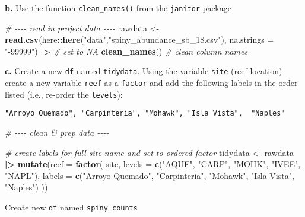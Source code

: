 \documentclass[
]{article}
\newenvironment{Shaded}{\begin{snugshade}}{\end{snugshade}}
\newcommand{\AttributeTok}[1]{\textcolor[rgb]{0.13,0.29,0.53}{#1}}
\newcommand{\CommentTok}[1]{\textcolor[rgb]{0.56,0.35,0.01}{\textit{#1}}}
\newcommand{\FunctionTok}[1]{\textcolor[rgb]{0.13,0.29,0.53}{\textbf{#1}}}
\newcommand{\NormalTok}[1]{#1}
\newcommand{\OtherTok}[1]{\textcolor[rgb]{0.56,0.35,0.01}{#1}}
\newcommand{\SpecialCharTok}[1]{\textcolor[rgb]{0.81,0.36,0.00}{\textbf{#1}}}
\newcommand{\StringTok}[1]{\textcolor[rgb]{0.31,0.60,0.02}{#1}}
\begin{document}
\textbf{b.} Use the function \texttt{clean\_names()} from the
\texttt{janitor} package

\begin{Shaded}
\begin{Highlighting}[]
\CommentTok{\# {-}{-}{-}{-} read in project data {-}{-}{-}{-}}
\NormalTok{rawdata }\OtherTok{\textless{}{-}} \FunctionTok{read.csv}\NormalTok{(here}\SpecialCharTok{::}\FunctionTok{here}\NormalTok{(}\StringTok{"data"}\NormalTok{,}\StringTok{"spiny\_abundance\_sb\_18.csv"}\NormalTok{), }
                    \AttributeTok{na.strings =} \StringTok{"{-}99999"}\NormalTok{) }\SpecialCharTok{|\textgreater{}} \CommentTok{\# set to NA}
    \FunctionTok{clean\_names}\NormalTok{() }\CommentTok{\# clean column names}
\end{Highlighting}
\end{Shaded}

\textbf{c.} Create a new \texttt{df} named \texttt{tidydata}. Using the
variable \texttt{site} (reef location) create a new variable
\texttt{reef} as a \texttt{factor} and add the following labels in the
order listed (i.e., re-order the \texttt{levels}):

\begin{verbatim}
"Arroyo Quemado", "Carpinteria", "Mohawk", "Isla Vista",  "Naples"
\end{verbatim}

\begin{Shaded}
\begin{Highlighting}[]
\CommentTok{\# {-}{-}{-}{-} clean \& prep data {-}{-}{-}{-}}

\CommentTok{\# create labels for full site name and set to ordered factor}
\NormalTok{tidydata }\OtherTok{\textless{}{-}}\NormalTok{ rawdata }\SpecialCharTok{|\textgreater{}}
    \FunctionTok{mutate}\NormalTok{(}\AttributeTok{reef =} \FunctionTok{factor}\NormalTok{( site, }
                          \AttributeTok{levels =} \FunctionTok{c}\NormalTok{(}\StringTok{"AQUE"}\NormalTok{, }\StringTok{"CARP"}\NormalTok{, }\StringTok{"MOHK"}\NormalTok{, }\StringTok{"IVEE"}\NormalTok{,  }\StringTok{"NAPL"}\NormalTok{),}
                          \AttributeTok{labels =} \FunctionTok{c}\NormalTok{(}\StringTok{"Arroyo Quemado"}\NormalTok{, }\StringTok{"Carpinteria"}\NormalTok{, }\StringTok{"Mohawk"}\NormalTok{, }\StringTok{"Isla Vista"}\NormalTok{,  }\StringTok{"Naples"}\NormalTok{)}
\NormalTok{    ))}
\end{Highlighting}
\end{Shaded}

Create new \texttt{df} named \texttt{spiny\_counts}
\end{document}
